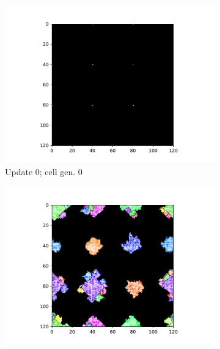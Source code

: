 \begin{figure}%
\begin{center}


\begin{subfigure}[b]{0.33\columnwidth}
  \includegraphics[width=\columnwidth,trim={2.5cm 0.5cm 2.5cm 1cm},clip]{img/ChannelMap_1030_update0}
  \vspace{-5ex}
  \caption{Update 0; cell gen. 0}
  \label{fig:ChannelMap_1030_update0}
\end{subfigure}%
\begin{subfigure}[b]{0.33\columnwidth}
  \includegraphics[width=\columnwidth,trim={2.5cm 0.5cm 2.5cm 1cm},clip]{img/ChannelMap_1030_update5552}
  \vspace{-5ex}

\end{subfigure}
\end{center}
\end{figure}
